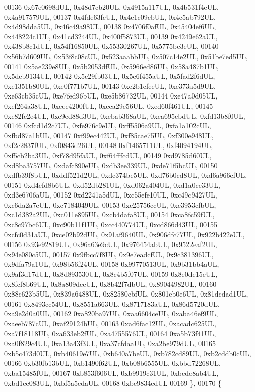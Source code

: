 \begin{DoxyCode}
00136     0x67e0698dUL, 0x48d7cb20UL, 0x4915a117UL, 0x4b531f4eUL, 0x4a917579UL,
00137     0x4fde63fcUL, 0x4e1c09cbUL, 0x4c5ab792UL, 0x4d98dda5UL, 0x46c49a98UL,
00138     0x4706f0afUL, 0x45404ef6UL, 0x448224c1UL, 0x41cd3244UL, 0x400f5873UL,
00139     0x4249e62aUL, 0x438b8c1dUL, 0x54f16850UL, 0x55330267UL, 0x5775bc3eUL,
00140     0x56b7d609UL, 0x53f8c08cUL, 0x523aaabbUL, 0x507c14e2UL, 0x51be7ed5UL,
00141     0x5ae239e8UL, 0x5b2053dfUL, 0x5966ed86UL, 0x58a487b1UL, 0x5deb9134UL,
00142     0x5c29fb03UL, 0x5e6f455aUL, 0x5fad2f6dUL, 0xe1351b80UL, 0xe0f771b7UL,
00143     0xe2b1cfeeUL, 0xe373a5d9UL, 0xe63cb35cUL, 0xe7fed96bUL, 0xe5b86732UL,
00144     0xe47a0d05UL, 0xef264a38UL, 0xeee4200fUL, 0xeca29e56UL, 0xed60f461UL,
00145     0xe82fe2e4UL, 0xe9ed88d3UL, 0xebab368aUL, 0xea695cbdUL, 0xfd13b8f0UL,
00146     0xfcd1d2c7UL, 0xfe976c9eUL, 0xff5506a9UL, 0xfa1a102cUL, 0xfbd87a1bUL,
00147     0xf99ec442UL, 0xf85cae75UL, 0xf300e948UL, 0xf2c2837fUL, 0xf0843d26UL,
00148     0xf1465711UL, 0xf4094194UL, 0xf5cb2ba3UL, 0xf78d95faUL, 0xf64fffcdUL,
00149     0xd9785d60UL, 0xd8ba3757UL, 0xdafc890eUL, 0xdb3ee339UL, 0xde71f5bcUL,
00150     0xdfb39f8bUL, 0xddf521d2UL, 0xdc374be5UL, 0xd76b0cd8UL, 0xd6a966efUL,
00151     0xd4efd8b6UL, 0xd52db281UL, 0xd062a404UL, 0xd1a0ce33UL, 0xd3e6706aUL,
00152     0xd2241a5dUL, 0xc55efe10UL, 0xc49c9427UL, 0xc6da2a7eUL, 0xc7184049UL,
00153     0xc25756ccUL, 0xc3953cfbUL, 0xc1d382a2UL, 0xc011e895UL, 0xcb4dafa8UL,
00154     0xca8fc59fUL, 0xc8c97bc6UL, 0xc90b11f1UL, 0xcc440774UL, 0xcd866d43UL,
00155     0xcfc0d31aUL, 0xce02b92dUL, 0x91af9640UL, 0x906dfc77UL, 0x922b422eUL,
00156     0x93e92819UL, 0x96a63e9cUL, 0x976454abUL, 0x9522eaf2UL, 0x94e080c5UL,
00157     0x9fbcc7f8UL, 0x9e7eadcfUL, 0x9c381396UL, 0x9dfa79a1UL, 0x98b56f24UL,
00158     0x99770513UL, 0x9b31bb4aUL, 0x9af3d17dUL, 0x8d893530UL, 0x8c4b5f07UL,
00159     0x8e0de15eUL, 0x8fcf8b69UL, 0x8a809decUL, 0x8b42f7dbUL, 0x89044982UL,
00160     0x88c623b5UL, 0x839a6488UL, 0x82580ebfUL, 0x801eb0e6UL, 0x81dcdad1UL,
00161     0x8493cc54UL, 0x8551a663UL, 0x8717183aUL, 0x86d5720dUL, 0xa9e2d0a0UL,
00162     0xa820ba97UL, 0xaa6604ceUL, 0xaba46ef9UL, 0xaeeb787cUL, 0xaf29124bUL,
00163     0xad6fac12UL, 0xacadc625UL, 0xa7f18118UL, 0xa633eb2fUL, 0xa4755576UL,
00164     0xa5b73f41UL, 0xa0f829c4UL, 0xa13a43f3UL, 0xa37cfdaaUL, 0xa2be979dUL,
00165     0xb5c473d0UL, 0xb40619e7UL, 0xb640a7beUL, 0xb782cd89UL, 0xb2cddb0cUL,
00166     0xb30fb13bUL, 0xb1490f62UL, 0xb08b6555UL, 0xbbd72268UL, 0xba15485fUL,
00167     0xb853f606UL, 0xb9919c31UL, 0xbcde8ab4UL, 0xbd1ce083UL, 0xbf5a5edaUL,
00168     0xbe9834edUL
00169   \},
00170   \{

\end{DoxyCode}
